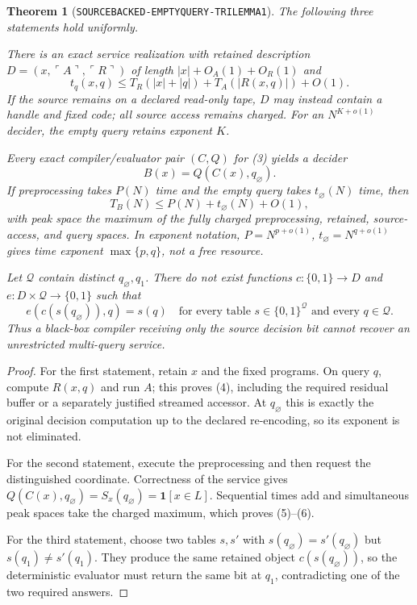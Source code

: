\documentclass[11pt]{article}
\newtheorem{theorem}{Theorem}
\begin{document}
\begin{theorem}[\texttt{SOURCEBACKED-EMPTYQUERY-TRILEMMA1}]
The following three statements hold uniformly.

\begin{description}[leftmargin=3.4cm,style=nextline]
\item[Source-backed realization.]
There is an exact service realization with retained description
$D=(x,\ulcorner A\urcorner,\ulcorner R\urcorner)$ of length
$|x|+O_A(1)+O_R(1)$ and
\[
 t_q(x,q)\le T_R(|x|+|q|)+T_A(|R(x,q)|)+O(1).               \tag{4}
\]
If the source remains on a declared read-only tape, $D$ may instead contain
a handle and fixed code; all source access remains charged.  For an
$N^{K+o(1)}$ decider, the empty query retains exponent $K$.

\item[Empty-query reversal.]
Every exact compiler/evaluator pair $(C,Q)$ for (3) yields a decider
\[
 B(x)=Q(C(x),q_\varnothing).                                 \tag{5}
\]
If preprocessing takes $P(N)$ time and the empty query takes $t_\varnothing(N)$
time, then
\[
 T_B(N)\le P(N)+t_\varnothing(N)+O(1),                       \tag{6}
\]
with peak space the maximum of the fully charged preprocessing, retained,
source-access, and query spaces.  In exponent notation,
$P=N^{p+o(1)}$, $t_\varnothing=N^{q+o(1)}$ gives time exponent
$\max\{p,q\}$, not a free resource.

\item[Decision-bit-only impossibility.]
Let $\mathcal Q$ contain distinct $q_\varnothing,q_1$.  There do not exist
functions $c:\{0,1\}\to D$ and $e:D\times\mathcal Q\to\{0,1\}$ such that
\[
 e(c(s(q_\varnothing)),q)=s(q)
 \quad\text{for every table }s\in\{0,1\}^{\mathcal Q}
 \text{ and every }q\in\mathcal Q.                          \tag{7}
\]
Thus a black-box compiler receiving only the source decision bit cannot
recover an unrestricted multi-query service.
\end{description}
\end{theorem}

\begin{proof}
For the first statement, retain $x$ and the fixed programs.  On query $q$,
compute $R(x,q)$ and run $A$; this proves (4), including the required
residual buffer or a separately justified streamed accessor.  At
$q_\varnothing$ this is exactly the original decision computation up to the
declared re-encoding, so its exponent is not eliminated.

For the second statement, execute the preprocessing and then request the
distinguished coordinate.  Correctness of the service gives
$Q(C(x),q_\varnothing)=S_x(q_\varnothing)=\mathbf 1[x\in L]$.
Sequential times add and simultaneous peak spaces take the charged maximum,
which proves (5)--(6).

For the third statement, choose two tables $s,s'$ with
$s(q_\varnothing)=s'(q_\varnothing)$ but $s(q_1)\ne s'(q_1)$.  They produce
the same retained object $c(s(q_\varnothing))$, so the deterministic
evaluator must return the same bit at $q_1$, contradicting one of the two
required answers.
\end{proof}
\end{document}
